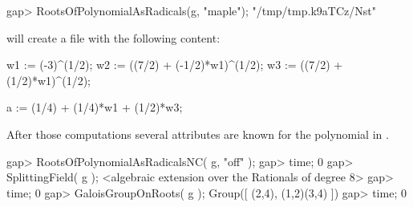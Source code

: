 \beginexample
gap> RootsOfPolynomialAsRadicals(g, "maple");
"/tmp/tmp.k9aTCz/Nst"
\endexample

will create a file with the following content:

\beginexample
w1 := (-3)^(1/2);
w2 := ((7/2) + (-1/2)*w1)^(1/2);
w3 := ((7/2) + (1/2)*w1)^(1/2);

a := (1/4) + (1/4)*w1 + (1/2)*w3;
\endexample

After those computations several attributes are known for the
polynomial in \GAP. 

\beginexample
gap> RootsOfPolynomialAsRadicalsNC( g, "off" );
gap> time;
0
gap> SplittingField( g );
<algebraic extension over the Rationals of degree 8>
gap> time;
0
gap> GaloisGroupOnRoots( g );
Group([ (2,4), (1,2)(3,4) ])
gap> time;
0
\endexample






